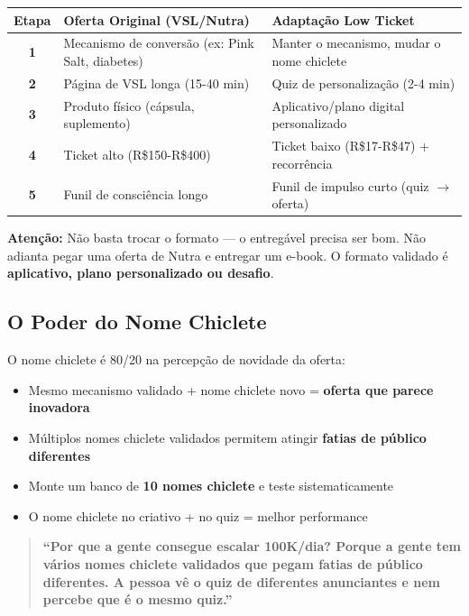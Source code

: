 \documentclass[12pt, a4paper]{article}
\begin{document}
\begin{table}[H]
    \centering
    \renewcommand{\arraystretch}{1.5}
    \begin{tabularx}{\textwidth}{c X X}
        \toprule
        \rowcolor{tableHeader} \textbf{Etapa} & \textbf{Oferta Original (VSL/Nutra)} & \textbf{Adaptação Low Ticket} \\
        \midrule
        \textbf{1} & Mecanismo de conversão (ex: Pink Salt, diabetes) & Manter o mecanismo, mudar o nome chiclete \\
        \rowcolor{lightGray}
        \textbf{2} & Página de VSL longa (15-40 min) & Quiz de personalização (2-4 min) \\
        \textbf{3} & Produto físico (cápsula, suplemento) & Aplicativo/plano digital personalizado \\
        \rowcolor{lightGray}
        \textbf{4} & Ticket alto (R\$150-R\$400) & Ticket baixo (R\$17-R\$47) + recorrência \\
        \textbf{5} & Funil de consciência longo & Funil de impulso curto (quiz $\rightarrow$ oferta) \\
        \bottomrule
    \end{tabularx}
\end{table}

\textcolor{accentColor}{\textbf{Atenção:}} Não basta trocar o formato --- o entregável precisa ser bom. Não adianta pegar uma oferta de Nutra e entregar um e-book. O formato validado é \textbf{aplicativo, plano personalizado ou desafio}.

\subsection{O Poder do Nome Chiclete}

O nome chiclete é 80/20 na percepção de novidade da oferta:

\begin{itemize}
    \item Mesmo mecanismo validado + nome chiclete novo = \textbf{oferta que parece inovadora}
    \item Múltiplos nomes chiclete validados permitem atingir \textbf{fatias de público diferentes}
    \item Monte um banco de \textbf{10 nomes chiclete} e teste sistematicamente
    \item O nome chiclete no criativo + no quiz = melhor performance
\end{itemize}

\begin{quote}
\textcolor{primaryColor}{\textbf{``Por que a gente consegue escalar 100K/dia? Porque a gente tem vários nomes chiclete validados que pegam fatias de público diferentes. A pessoa vê o quiz de diferentes anunciantes e nem percebe que é o mesmo quiz.''}}
\end{quote}
\end{document}
